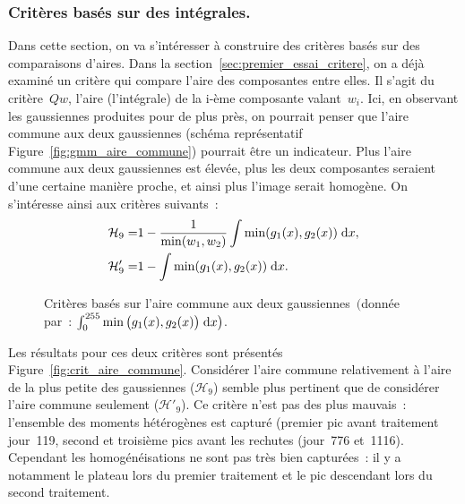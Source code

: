 \documentclass[main.tex]{subfiles}
\begin{document}
\subsubsection{Critères basés sur des intégrales.}
Dans cette section, on va s'intéresser à construire des critères basés sur des comparaisons  d'aires. Dans la section~\ref{sec:premier_essai_critere}, on a déjà examiné un critère qui compare l'aire des composantes entre elles. Il s'agit du critère~$Qw$, l'aire (l'intégrale) de la i-ème composante valant~$w_i$. 
Ici, en observant les gaussiennes produites pour \Nber de plus près, on pourrait penser que l'aire commune aux deux gaussiennes (\cf schéma représentatif Figure~\ref{fig:gmm_aire_commune}) pourrait être un indicateur. Plus l'aire commune aux deux gaussiennes est élevée, plus les deux composantes seraient d'une certaine manière proche, et ainsi plus l'image serait homogène.  On s'intéresse ainsi aux critères suivants~:
\begin{align}
\mathcal{H}_9 =& 1 - \dfrac{ 1 }{\min(w_1,w_2)}\int \min(g_1(x),g_2(x)) \;{\rm d}x, \\
\mathcal{H}'_9 =& 1-\int \min(g_1(x),g_2(x)) \;{\rm d}x.
\end{align}
\begin{figure}
\caption{Critères basés sur l'aire commune aux deux gaussiennes~$\big($donnée par~: $\int_0^{255} \min \big(g_1(x),g_2(x) \big) \;{\rm d}x \big)$.}
\end{figure}
Les résultats pour ces deux critères sont présentés  Figure~\ref{fig:crit_aire_commune}. 
Considérer l'aire commune relativement à l'aire de la plus petite des gaussiennes ($\mathcal{H}_9$) semble plus pertinent que de considérer l'aire commune seulement ($\mathcal{H}'_9$). Ce critère n'est pas des plus mauvais~: l'ensemble des moments hétérogènes est capturé (premier pic avant traitement jour~119, second et troisième pics avant les rechutes (jour~776 et~1116). Cependant les homogénéisations ne sont pas très bien capturées~: il y a notamment le plateau lors du premier traitement et le pic descendant lors du second traitement.
\end{document}

